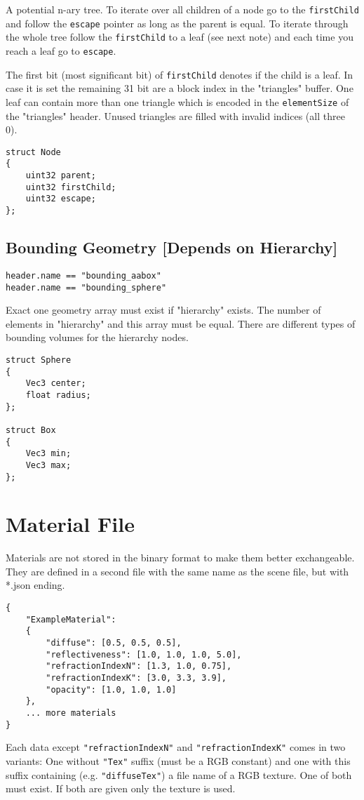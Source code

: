 \documentclass[english,10pt,a4paper,twocolumn,colorscheme=green]{orarticle}
\begin{document}
	A potential n-ary tree. To iterate over all children of a node go to the \lstinline|firstChild| and follow the \lstinline|escape| pointer as long as the parent is equal. To iterate through the whole tree follow the \lstinline|firstChild| to a leaf (see next note) and each time you reach a leaf go to \lstinline|escape|.
	
	The first bit (most significant bit) of \lstinline|firstChild| denotes if the child is a leaf. In case it is set the remaining 31 bit are a block index in the "triangles" buffer. One leaf can contain more than one triangle which is encoded in the \lstinline|elementSize| of the "triangles" header. Unused triangles are filled with invalid indices (all three 0).
	\begin{lstlisting}
struct Node
{
	uint32 parent;
	uint32 firstChild;
	uint32 escape;
};
	\end{lstlisting}
	
	\subsection{Bounding Geometry [Depends on Hierarchy]}
	\lstinline|header.name == "bounding_aabox"|\\
	\lstinline|header.name == "bounding_sphere"|
	
	Exact one geometry array must exist if "hierarchy" exists. The number of elements in "hierarchy" and this array must be equal. There are different types of bounding volumes for the hierarchy nodes.
	\begin{lstlisting}
struct Sphere
{
	Vec3 center;
	float radius;
};

struct Box
{
	Vec3 min;
	Vec3 max;
};
	\end{lstlisting}
	
	
		
	\section{Material File}
	Materials are not stored in the binary format to make them better exchangeable. They are defined in a second file with the same name as the scene file, but with *.json ending.
	\begin{lstlisting}
{
  	"ExampleMaterial": 
  	{
		"diffuse": [0.5, 0.5, 0.5],
		"reflectiveness": [1.0, 1.0, 1.0, 5.0],
		"refractionIndexN": [1.3, 1.0, 0.75],
		"refractionIndexK": [3.0, 3.3, 3.9],
		"opacity": [1.0, 1.0, 1.0]
  	},		
	... more materials
}
	\end{lstlisting}
	Each data except \lstinline|"refractionIndexN"| and \lstinline|"refractionIndexK"| comes in two variants: One without \lstinline|"Tex"| suffix (must be a RGB constant) and one with this suffix containing (e.g. \lstinline|"diffuseTex"|) a file name of a RGB texture. One of both must exist. If both are given only the texture is used.
	
\end{document}
